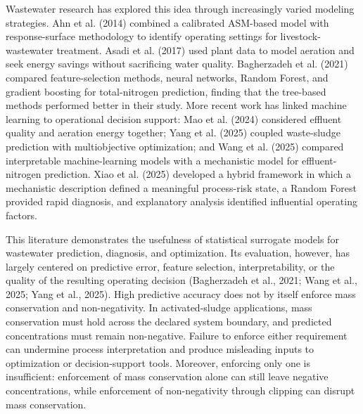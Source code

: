 \documentclass[a4paper,fleqn]{cas-sc}
\begin{document}
Wastewater research has explored this idea through increasingly varied modeling strategies. Ahn et al. (2014) combined a calibrated ASM-based model with response-surface methodology to identify operating settings for livestock-wastewater treatment. Asadi et al. (2017) used plant data to model aeration and seek energy savings without sacrificing water quality. Bagherzadeh et al. (2021) compared feature-selection methods, neural networks, Random Forest, and gradient boosting for total-nitrogen prediction, finding that the tree-based methods performed better in their study. More recent work has linked machine learning to operational decision support: Mao et al. (2024) considered effluent quality and aeration energy together; Yang et al. (2025) coupled waste-sludge prediction with multiobjective optimization; and Wang et al. (2025) compared interpretable machine-learning models with a mechanistic model for effluent-nitrogen prediction. Xiao et al. (2025) developed a hybrid framework in which a mechanistic description defined a meaningful process-risk state, a Random Forest provided rapid diagnosis, and explanatory analysis identified influential operating factors.

This literature demonstrates the usefulness of statistical surrogate models for wastewater prediction, diagnosis, and optimization. Its evaluation, however, has largely centered on predictive error, feature selection, interpretability, or the quality of the resulting operating decision (Bagherzadeh et al., 2021; Wang et al., 2025; Yang et al., 2025). High predictive accuracy does not by itself enforce mass conservation and non-negativity. In activated-sludge applications, mass conservation must hold across the declared system boundary, and predicted concentrations must remain non-negative. Failure to enforce either requirement can undermine process interpretation and produce misleading inputs to optimization or decision-support tools. Moreover, enforcing only one is insufficient: enforcement of mass conservation alone can still leave negative concentrations, while enforcement of non-negativity through clipping can disrupt mass conservation.
\end{document}
